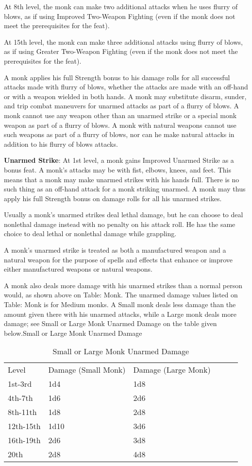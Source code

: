 At 8th level, the monk can make two additional attacks when he uses flurry of blows, as if using Improved Two-Weapon Fighting (even if the monk does not meet the prerequisites for the feat).
				
At 15th level, the monk can make three additional attacks using flurry of blows, as if using Greater Two-Weapon Fighting (even if the monk does not meet the prerequisites for the feat). 
				
A monk applies his full Strength bonus to his damage rolls for all successful attacks made with flurry of blows, whether the attacks are made with an off-hand or with a weapon wielded in both hands. A monk may substitute disarm, sunder, and trip combat maneuvers for unarmed attacks as part of a flurry of blows. A monk cannot use any weapon other than an unarmed strike or a special monk weapon as part of a flurry of blows. A monk with natural weapons cannot use such weapons as part of a flurry of blows, nor can he make natural attacks in addition to his flurry of blows attacks.
				
\textbf{Unarmed Strike}: At 1st level, a monk gains Improved Unarmed Strike as a bonus feat. A monk's attacks may be with fist, elbows, knees, and feet. This means that a monk may make unarmed strikes with his hands full. There is no such thing as an off-hand attack for a monk striking unarmed. A monk may thus apply his full Strength bonus on damage rolls for all his unarmed strikes.
				
Usually a monk's unarmed strikes deal lethal damage, but he can choose to deal nonlethal damage instead with no penalty on his attack roll. He has the same choice to deal lethal or nonlethal damage while grappling.
				
A monk's unarmed strike is treated as both a manufactured weapon and a natural weapon for the purpose of spells and effects that enhance or improve either manufactured weapons or natural weapons.
				
A monk also deals more damage with his unarmed strikes than a normal person would, as shown above on Table: Monk. The unarmed damage values listed on Table: Monk is for Medium monks. A Small monk deals less damage than the amount given there with his unarmed attacks, while a Large monk deals more damage; see Small or Large Monk Unarmed Damage on the table given below.Small or Large Monk Unarmed Damage
\begin{table}[]
\sffamily
\caption{Small or Large Monk Unarmed Damage}
\begin{tabular}{llllll}
Level & Damage (Small Monk) & Damage (Large Monk)\\
1st-3rd   & 1d4  & 1d8 \\
4th-7th   & 1d6  & 2d6 \\
8th-11th  & 1d8  & 2d8 \\
12th-15th & 1d10 & 3d6 \\
16th-19th & 2d6  & 3d8 \\
20th & 2d8 & 4d8\\
\end{tabular}
\end{table}
		
